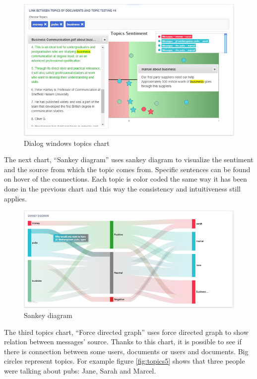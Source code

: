 \documentclass{article}
\begin{document}
\begin{figure}[H]
  \centering
  \includegraphics[scale=0.74]{charts/topics3.png}
  \caption{Dialog windows topics chart}
  \label{fig:topics3}
\end{figure}

{\large 
The next chart, ``Sankey diagram'' uses sankey diagram to visualize the sentiment and the source from which the topic comes from. Specific sentences can be found on hover of the connections. Each topic is color coded the same way it has been done in the previous chart and this way the consistency and intuitiveness still applies.\par 
}

\begin{figure}[H]
  \centering
  \includegraphics[scale=0.76]{charts/topics4.png}
  \caption{Sankey diagram}
  \label{fig:topics4}
\end{figure}

{\large
The third topics chart, ``Force directed graph'' uses force directed graph to show relation between messages' source. Thanks to this chart, it is possible to see if there is connection between some users, documents or users and documents. Big circles represent topics. For example figure \ref{fig:topics5} shows that three people were talking about pubs: Jane, Sarah and Marcel.\par 
}
\end{document}

